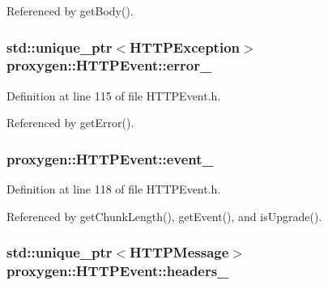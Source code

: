 Referenced by get\+Body().

\subsubsection[{error\+\_\+}]{\setlength{\rightskip}{0pt plus 5cm}std\+::unique\+\_\+ptr$<${\bf H\+T\+T\+P\+Exception}$>$ proxygen\+::\+H\+T\+T\+P\+Event\+::error\+\_\+\hspace{0.3cm}{\ttfamily [private]}}\label{classproxygen_1_1HTTPEvent_a4f5f269718d62d7acf40b53149787728}


Definition at line 115 of file H\+T\+T\+P\+Event.\+h.



Referenced by get\+Error().

\subsubsection[{event\+\_\+}]{ proxygen\+::\+H\+T\+T\+P\+Event\+::event\+\_\+\hspace{0.3cm}{\ttfamily [private]}}\label{classproxygen_1_1HTTPEvent_aeeb6958cd4a665b493de5ed1d69473d2}


Definition at line 118 of file H\+T\+T\+P\+Event.\+h.



Referenced by get\+Chunk\+Length(), get\+Event(), and is\+Upgrade().

\subsubsection[{headers\+\_\+}]{\setlength{\rightskip}{0pt plus 5cm}std\+::unique\+\_\+ptr$<${\bf H\+T\+T\+P\+Message}$>$ proxygen\+::\+H\+T\+T\+P\+Event\+::headers\+\_\+\hspace{0.3cm}{\ttfamily [private]}}\label{classproxygen_1_1HTTPEvent_a090e2998d29abcfc811c57a7acdfe230}


